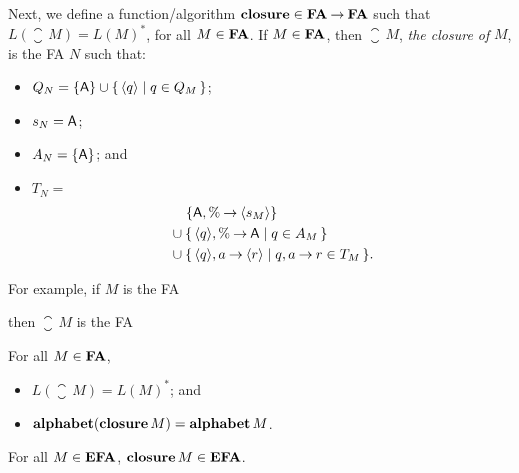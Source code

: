 %
%
%
%
Next, we define a function/algorithm $\mathbf{closure}\in\mathbf{FA}\mathbin{\to}\mathbf{FA}$ such that
$L(\closure\,M)=L(M)^*$, for all $M\in\mathbf{FA}$.  If $M\in\mathbf{FA}$, then
$\closure\,M$, \emph{the closure of} $M$, is the FA $N$ such that:
\begin{itemize}
\item $Q_N=\{\mathsf{A}\}\cup\{ \, \langle q\rangle \mid q\in Q_M \, \}$;

\item $s_N=\mathsf{A}$;

\item $A_N=\{\mathsf{A}\}$; and

\item $T_N={}$
  \begin{align*}
    &\quad\, \{\mathsf{A},\%\mathbin{\to}\langle s_M\rangle\} \\
    &\cup \{ \, \langle q\rangle,\%\mathbin{\to}\mathsf{A} \mid q\in A_M \, \} \\
    &\cup \{ \, \langle q\rangle,a\mathbin{\to}\langle r\rangle \mid q,a\mathbin{\to} r\in
      T_M \, \}.
  \end{align*}
\end{itemize}

For example, if $M$ is the FA
\begin{center}

\end{center}
then $\closure\,M$ is the FA
\begin{center}

\end{center}

\begin{proposition}
For all $M\in\mathbf{FA}$,
\begin{itemize}
\item $L(\closure\,M)=L(M)^*$; and

\item $\mathbf{alphabet}(\mathbf{closure}\,M)=\mathbf{alphabet}\,M$.
\end{itemize}
\end{proposition}

\begin{proposition}
For all $M\in\mathbf{EFA}$, $\mathbf{closure}\,M\in\mathbf{EFA}$.
\end{proposition}

